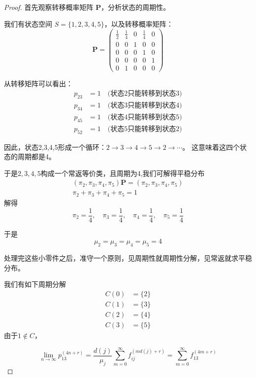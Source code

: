 \documentclass[lang=cn,10pt,thmcnt=section]{elegantbook}
\begin{document}
\begin{proof}
	首先观察转移概率矩阵 $\mathbf{P}$，分析状态的周期性。

我们有状态空间 $S = \{1, 2, 3, 4, 5\}$，以及转移概率矩阵：
\[
\mathbf{P} = \begin{pmatrix}
\frac{1}{2} & \frac{1}{4} & 0 & \frac{1}{4} & 0 \\
0 & 0 & 1 & 0 & 0 \\
0 & 0 & 0 & 1 & 0 \\
0 & 0 & 0 & 0 & 1 \\
0 & 1 & 0 & 0 & 0
\end{pmatrix}
\]

从转移矩阵可以看出：
\begin{align}
p_{23} &= 1 \quad \text{(状态2只能转移到状态3)} \\
p_{34} &= 1 \quad \text{(状态3只能转移到状态4)} \\
p_{45} &= 1 \quad \text{(状态4只能转移到状态5)} \\
p_{52} &= 1 \quad \text{(状态5只能转移到状态2)}
\end{align}

因此，状态2,3,4,5形成一个循环：$2 \to 3 \to 4 \to 5 \to 2 \to \cdots$。
这意味着这四个状态的周期都是4。

于是$2,3,4,5$构成一个常返等价类，且周期为4,我们可解得平稳分布
\begin{equation*}
	\begin{split}
		(\pi_2,\pi_3,\pi_4,\pi_5)\mathbf{P} = (\pi_2,\pi_3,\pi_4,\pi_5)\\
		\pi_2 + \pi_3 + \pi_4 + \pi_5 = 1
	\end{split}
\end{equation*}
解得
\[
\pi_2 = \frac{1}{4}, \quad \pi_3 = \frac{1}{4}, \quad \pi_4 = \frac{1}{4}, \quad \pi_5 = \frac{1}{4}
\]

于是
\[
\mu_2 = \mu_3 = \mu_4 = \mu_5 = 4
\]

处理完这些小零件之后，准守一个原则，$\textbf{见周期性就周期性分解}$，见常返就求平稳分布。

我们有如下周期分解
\[
\begin{split}
	C(0) &= \{2\}\\
	C(1) &= \{3\}\\
	C(2) &= \{4\}\\
	C(3) &= \{5\}
\end{split}
\]
由于$1\notin C$，

\[
	\lim_{n \to \infty} p_{13}^{(4n+r)} = \frac{d(j)}{\mu_j} \sum_{m=0}^{\infty} f_{ij}^{(md(j)+r)}=\sum_{m=0}^{\infty} f_{13}^{(4m+r)}
\]


\end{proof}
\end{document}
